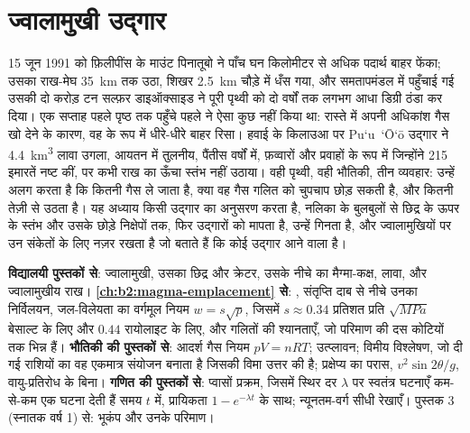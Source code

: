 \chapter{ज्वालामुखी उद्गार}\label{ch:b2:eruptive-styles}

15 जून 1991 को फ़िलीपींस के माउंट पिनातूबो ने पाँच घन किलोमीटर से अधिक
पदार्थ बाहर फेंका; उसका राख-मेघ
\qty{35}{km} तक उठा, शिखर \qty{2.5}{km} चौड़े  में धँस गया, और
समतापमंडल में पहुँचाई गई उसकी दो करोड़ टन सल्फ़र डाइऑक्साइड ने पूरी
पृथ्वी को दो वर्षों तक लगभग आधा डिग्री ठंडा कर दिया। एक सप्ताह पहले पृष्ठ तक पहुँचे पहले
 ने ऐसा कुछ नहीं किया था: रास्ते में अपनी अधिकांश गैस खो देने के कारण,
वह  के रूप में धीरे-धीरे बाहर रिसा। हवाई के किलाउआ पर
Pu`u~`\=O`\=o उद्गार ने \qty{4.4}{km^3} लावा उगला, आयतन में तुलनीय,
पैंतीस वर्षों में, फ़व्वारों और प्रवाहों के रूप में जिन्होंने 215 इमारतें नष्ट कीं,
पर कभी राख का ऊँचा स्तंभ नहीं उठाया। वही पृथ्वी, वही भौतिकी, तीन व्यवहार: उन्हें
अलग करता है कि  कितनी गैस ले जाता है, क्या वह गैस गलित को चुपचाप
छोड़ सकती है, और  कितनी तेज़ी से उठता है। यह अध्याय किसी उद्गार का
अनुसरण करता है, नलिका के बुलबुलों से छिद्र के ऊपर के स्तंभ और उसके छोड़े
निक्षेपों तक, फिर उद्गारों को मापता है, उन्हें गिनता है, और ज्वालामुखियों पर उन
संकेतों के लिए नज़र रखता है जो बताते हैं कि कोई उद्गार आने वाला है।

\begin{recall}
\textbf{विद्यालयी पुस्तकों से}: ज्वालामुखी, उसका छिद्र और क्रेटर, उसके नीचे का मैग्मा-कक्ष,
लावा, और ज्वालामुखीय राख। \textbf{\cref{ch:b2:magma-emplacement}
से}: , संतृप्ति दाब से नीचे उनका निर्विलयन,
जल-विलेयता का वर्गमूल नियम $w = s\sqrt p$, जिसमें
$s \approx 0.34$ प्रतिशत प्रति $\sqrt{\unit{MPa}}$ बेसाल्ट के लिए और $0.44$
रायोलाइट के लिए, और गलितों की श्यानताएँ, जो परिमाण की दस कोटियों तक भिन्न हैं।
\textbf{भौतिकी की पुस्तकों से}: आदर्श गैस नियम $pV = nRT$; उत्प्लावन;
विमीय विश्लेषण, जो दी गई राशियों का वह एकमात्र संयोजन बनाता है
जिसकी विमा उत्तर की है; प्रक्षेप्य का परास, $v^2\sin 2\theta/g$,
वायु-प्रतिरोध के बिना। \textbf{गणित की पुस्तकों से}: प्वासों प्रक्रम,
जिसमें स्थिर दर $\lambda$ पर स्वतंत्र घटनाएँ कम-से-कम एक घटना देती हैं
समय $t$ में, प्रायिकता $1 - e^{-\lambda t}$ के साथ; न्यूनतम-वर्ग सीधी रेखाएँ।
पुस्तक 3 (स्नातक वर्ष 1) से: भूकंप और उनके परिमाण।
\end{recall}

